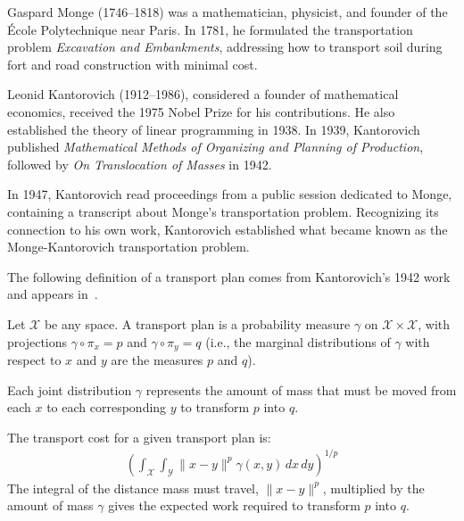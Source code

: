 Gaspard Monge (1746--1818) was a mathematician, physicist, and founder of the École Polytechnique near Paris. In 1781, he formulated the transportation problem \textit{Excavation and Embankments}, addressing how to transport soil during fort and road construction with minimal cost.

Leonid Kantorovich (1912--1986), considered a founder of mathematical economics, received the 1975 Nobel Prize for his contributions. He also established the theory of linear programming in 1938. In 1939, Kantorovich published \textit{Mathematical Methods of Organizing and Planning of Production}, followed by \textit{On Translocation of Masses} in 1942.

In 1947, Kantorovich read proceedings from a public session dedicated to Monge, containing a transcript about Monge's transportation problem. Recognizing its connection to his own work, Kantorovich established what became known as the Monge-Kantorovich transportation problem.

The following definition of a transport plan comes from Kantorovich's 1942 work~\cite{ref:kantorovich-1942} and appears in~\cite{ref:vershik-2013}.

\begin{definition}%
	\label{def:transport-plan}
	Let $\mathcal{X}$ be any space. A \textnormal{\sffamily transport plan} is a
	probability measure $\gamma$ on $\mathcal{X} \times \mathcal{X}$, with projections $\gamma
		\circ \pi_{x} = p$ and $\gamma \circ \pi_{y} = q$ (i.e., the
	marginal distributions of $\gamma$ with respect to $x$ and $y$ are the measures $p$ and $q$).
\end{definition}

\begin{remark}%
	\label{rmrk:mass}
	Each joint distribution $\gamma$ represents the amount of mass that must be moved from each $x$ to each corresponding $y$ to transform $p$ into $q$.
\end{remark}

\begin{definition}%
	\label{def:transport-cost}
	The \textnormal{\sffamily transport cost} for a given transport plan is:
	\begin{align}%
		\label{eq:expected-work}
		\left(\int_{\mathcal{X}}\int_{\mathcal{Y}}\|x-y\|^p\gamma(x, y)\,dx\,dy \right)^{1/p}
	\end{align}
	The integral of the distance mass must travel, $\|x-y\|^p$, multiplied by the amount of mass $\gamma$ gives the expected work required to transform $p$ into $q$.
\end{definition}

